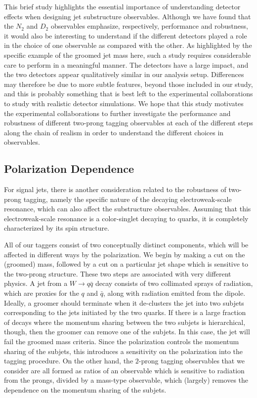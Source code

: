 This brief study highlights the essential importance
of understanding detector effects when designing jet substructure
observables.
%
Although we have found that the $N_2$ and $D_2$ observables emphasize,
respectively, performance and robustness, it would also be interesting
to understand if the different detectors played a role in the choice
of one observable as compared with the other.
%
As highlighted by the specific example of the groomed jet mass here, such a study requires considerable care to perform in a meaningful manner.
%
The detectors have a large impact, and the two detectors appear qualitatively similar in our analysis setup.
%
Differences may therefore be due to more subtle features, beyond those included in our study, and this is probably something that is best left to the experimental collaborations to study with realistic detector simulations.
%
We hope that this study motivates the experimental collaborations to further investigate the performance and robustness of different two-prong tagging observables at each of the different steps along the chain of realism in order to understand the different choices in observables.



\subsection{Polarization Dependence}\label{sec:SM_jetsub_2prong:polar}

For signal jets, there is another consideration related to the robustness of two-prong tagging, namely the specific nature of the decaying electroweak-scale resonance, which can also affect the substructure observables.
%
Assuming that this electroweak-scale resonance is a color-singlet decaying to quarks, it is completely
characterized by its spin structure.



All of our taggers consist of two conceptually distinct components, which will be affected in different ways by the polarization.
%
We begin by making a cut on the (groomed) mass, followed by a cut on a particular jet shape which is sensitive to the two-prong structure. These two steps are associated with very different physics. A jet from a $W\to q\bar q$ decay consists of two collimated sprays of radiation, which are proxies for the $q$ and $\bar q$, along with radiation emitted from the dipole.
%
Ideally, a groomer should terminate when it de-clusters the jet into two subjets corresponding to the jets initiated by the two quarks.
%
If there is a large fraction of decays where the momentum sharing between the two subjets is hierarchical, though, then the groomer can remove one of the subjets.
%
In this case, the jet will fail the groomed mass criteria.
%
Since the polarization controls the momentum sharing of the subjets, this introduces a sensitivity on the polarization into the tagging procedure.
%
On the other hand, the $2$-prong tagging observables that we consider are all formed as ratios of an observable which is sensitive to radiation from the prongs, divided by a mass-type observable, which (largely) removes the dependence on the momentum sharing of the subjets.

